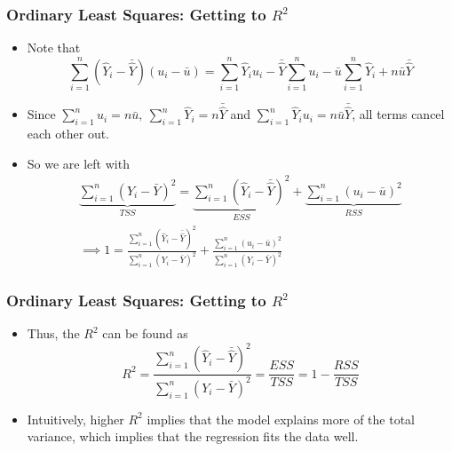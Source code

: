 \documentclass[aspectratio=169]{beamer}
\begin{document}
\begin{frame}
\frametitle{Ordinary Least Squares: Getting to $R^2$}
\begin{itemize}
\item Note that 
\footnotesize{\[
\sum_{i=1}^n(\hat{Y}_i - \bar{\hat{Y}}) (u_i - \bar{u})=\sum_{i=1}^n\hat{Y}_i{u}_i-\bar{\hat{Y}}\sum_{i=1}^nu_i -\bar{u}\sum_{i=1}^n\hat{Y}_i +n\bar{u}\bar{\hat{Y}}
\]}\normalsize
\item Since $\sum_{i=1}^nu_i = n\bar{u},\ \sum_{i=1}^n\hat{Y}_i = n\bar{\hat{Y}}$ and $\sum_{i=1}^n\hat{Y}_iu_i=n\bar{u}\bar{\hat{Y}}$, all terms cancel each other out. 
\item So we are left with
\footnotesize{\begin{gather*}
\underbrace{\sum_{i=1}^n (Y_i-\bar{Y})^2}_{TSS}= \underbrace{\sum_{i=1}^n (\hat{Y}_i - \bar{\hat{Y}})^2}_{ESS}+\underbrace{\sum_{i=1}^n(u_i - \bar{u})^2}_{RSS} \\
\implies 1=\frac{\sum_{i=1}^n (\hat{Y}_i - \bar{\hat{Y}})^2}{\sum_{i=1}^n (Y_i-\bar{Y})^2} + \frac{\sum_{i=1}^n(u_i - \bar{u})^2 }{\sum_{i=1}^n (Y_i-\bar{Y})^2}
\end{gather*}}\normalsize
\end{itemize}
\end{frame}


\begin{frame}
\frametitle{Ordinary Least Squares: Getting to $R^2$}
\begin{itemize}
\item Thus, the $R^2$ can be found as
\[
R^2 = \frac{\sum_{i=1}^n (\hat{Y}_i - \bar{\hat{Y}})^2}{\sum_{i=1}^n (Y_i-\bar{Y})^2} = \frac{ESS}{TSS} = 1-\frac{RSS}{TSS}
\]
\item Intuitively, higher $R^2$ implies that the model explains more of the total variance, which implies that the regression fits the data well. 
\end{itemize}
\end{frame}

\end{document}

